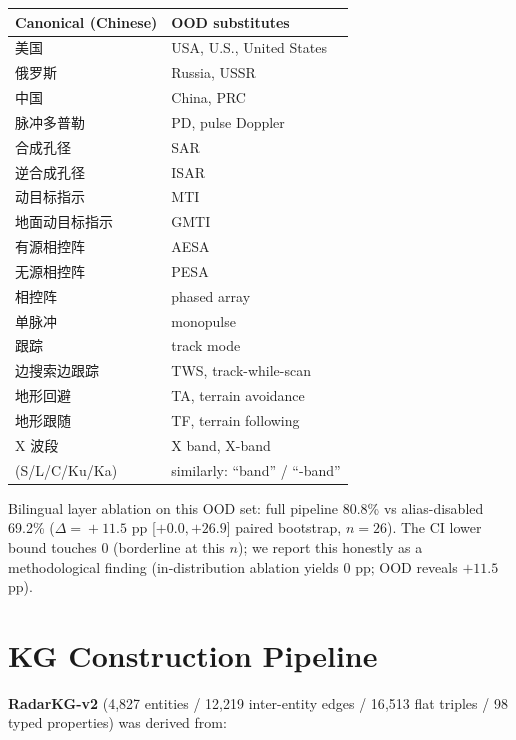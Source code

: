 \documentclass[11pt,a4paper]{article}
\begin{document}
\begin{table}[h]
\centering
\small
\begin{tabular}{l l}
\toprule
\textbf{Canonical (Chinese)} & \textbf{OOD substitutes} \\
\midrule
美国             & USA, U.S., United States \\
俄罗斯           & Russia, USSR \\
中国             & China, PRC \\
脉冲多普勒       & PD, pulse Doppler \\
合成孔径         & SAR \\
逆合成孔径       & ISAR \\
动目标指示       & MTI \\
地面动目标指示   & GMTI \\
有源相控阵       & AESA \\
无源相控阵       & PESA \\
相控阵           & phased array \\
单脉冲           & monopulse \\
跟踪             & track mode \\
边搜索边跟踪     & TWS, track-while-scan \\
地形回避         & TA, terrain avoidance \\
地形跟随         & TF, terrain following \\
X 波段           & X band, X-band \\
(S/L/C/Ku/Ka)    & similarly: ``band'' / ``-band'' \\
\bottomrule
\end{tabular}
\end{table}

Bilingual layer ablation on this OOD set: full pipeline 80.8\% vs alias-disabled 69.2\% ($\Delta\!=\!+11.5$ pp [$+0.0, +26.9$] paired bootstrap, $n\!=\!26$). The CI lower bound touches 0 (borderline at this $n$); we report this honestly as a methodological finding (in-distribution ablation yields 0 pp; OOD reveals $+11.5$ pp).

\section{KG Construction Pipeline}
\label{app:kg}

\textbf{RadarKG-v2} (4{,}827 entities / 12{,}219 inter-entity edges / 16{,}513 flat triples / 98 typed properties) was derived from:
\end{document}
